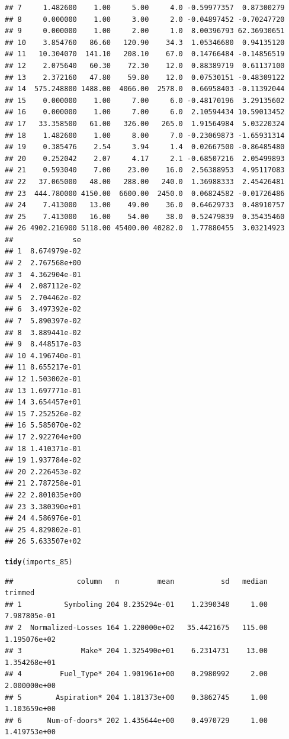 \documentclass{article}\usepackage[]{graphicx}\usepackage[]{color}
\makeatletter
\newcommand{\hlstd}[1]{\textcolor[rgb]{0.345,0.345,0.345}{#1}}%
\newcommand{\hlkwd}[1]{\textcolor[rgb]{0.737,0.353,0.396}{\textbf{#1}}}%
\newenvironment{kframe}{%
 \def\at@end@of@kframe{}%
 \ifinner\ifhmode%
  \def\at@end@of@kframe{\end{minipage}}%
  \begin{minipage}{\columnwidth}%
 \fi\fi%
 \def\FrameCommand##1{\hskip\@totalleftmargin \hskip-\fboxsep
 \colorbox{shadecolor}{##1}\hskip-\fboxsep
     \hskip-\linewidth \hskip-\@totalleftmargin \hskip\columnwidth}%
 \MakeFramed {\advance\hsize-\width
   \@totalleftmargin\z@ \linewidth\hsize
   \@setminipage}}%
 {\par\unskip\endMakeFramed%
 \at@end@of@kframe}
\newenvironment{knitrout}{}{} %
\makeatother
\begin{document}
\begin{knitrout}
\begin{kframe}
\begin{verbatim}
## 7     1.482600    1.00     5.00     4.0 -0.59977357  0.87300279
## 8     0.000000    1.00     3.00     2.0 -0.04897452 -0.70247720
## 9     0.000000    1.00     2.00     1.0  8.00396793 62.36930651
## 10    3.854760   86.60   120.90    34.3  1.05346680  0.94135120
## 11   10.304070  141.10   208.10    67.0  0.14766484 -0.14856519
## 12    2.075640   60.30    72.30    12.0  0.88389719  0.61137100
## 13    2.372160   47.80    59.80    12.0  0.07530151 -0.48309122
## 14  575.248800 1488.00  4066.00  2578.0  0.66958403 -0.11392044
## 15    0.000000    1.00     7.00     6.0 -0.48170196  3.29135602
## 16    0.000000    1.00     7.00     6.0  2.10594434 10.59013452
## 17   33.358500   61.00   326.00   265.0  1.91564984  5.03220324
## 18    1.482600    1.00     8.00     7.0 -0.23069873 -1.65931314
## 19    0.385476    2.54     3.94     1.4  0.02667500 -0.86485480
## 20    0.252042    2.07     4.17     2.1 -0.68507216  2.05499893
## 21    0.593040    7.00    23.00    16.0  2.56388953  4.95117083
## 22   37.065000   48.00   288.00   240.0  1.36988333  2.45426481
## 23  444.780000 4150.00  6600.00  2450.0  0.06824582 -0.01726486
## 24    7.413000   13.00    49.00    36.0  0.64629733  0.48910757
## 25    7.413000   16.00    54.00    38.0  0.52479839  0.35435460
## 26 4902.216900 5118.00 45400.00 40282.0  1.77880455  3.03214923
##              se
## 1  8.674979e-02
## 2  2.767568e+00
## 3  4.362904e-01
## 4  2.087112e-02
## 5  2.704462e-02
## 6  3.497392e-02
## 7  5.890397e-02
## 8  3.889441e-02
## 9  8.448517e-03
## 10 4.196740e-01
## 11 8.655217e-01
## 12 1.503002e-01
## 13 1.697771e-01
## 14 3.654457e+01
## 15 7.252526e-02
## 16 5.585070e-02
## 17 2.922704e+00
## 18 1.410371e-01
## 19 1.937784e-02
## 20 2.226453e-02
## 21 2.787258e-01
## 22 2.801035e+00
## 23 3.380390e+01
## 24 4.586976e-01
## 25 4.829802e-01
## 26 5.633507e+02
\end{verbatim}
\begin{alltt}
\hlkwd{tidy}\hlstd{(imports_85)}
\end{alltt}
\begin{verbatim}
##               column   n         mean           sd   median      trimmed
## 1          Symboling 204 8.235294e-01    1.2390348     1.00 7.987805e-01
## 2  Normalized-Losses 164 1.220000e+02   35.4421675   115.00 1.195076e+02
## 3              Make* 204 1.325490e+01    6.2314731    13.00 1.354268e+01
## 4         Fuel_Type* 204 1.901961e+00    0.2980992     2.00 2.000000e+00
## 5        Aspiration* 204 1.181373e+00    0.3862745     1.00 1.103659e+00
## 6      Num-of-doors* 202 1.435644e+00    0.4970729     1.00 1.419753e+00

\end{verbatim}
\end{kframe}
\end{knitrout}
\end{document}
